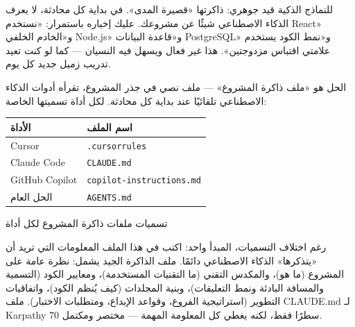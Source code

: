 


للنماذج الذكية قيد جوهري: ذاكرتها «قصيرة المدى». في بداية كل محادثة، لا يعرف الذكاء الاصطناعي شيئًا عن مشروعك. عليك إخباره باستمرار: «نستخدم React» و«الخادم الخلفي Node.js» و«قاعدة البيانات PostgreSQL» و«نمط الكود يستخدم علامتي اقتباس مزدوجتين». هذا غير فعال ويسهل فيه النسيان — كما لو كنت تعيد تدريب زميل جديد كل يوم.

الحل هو «ملف ذاكرة المشروع» — ملف نصي في جذر المشروع، تقرأه أدوات الذكاء الاصطناعي تلقائيًا عند بداية كل محادثة. لكل أداة تسميتها الخاصة:

\begin{center}
\begin{tabularx}{\linewidth}{|X|X|}
\hline
\textbf{الأداة} & \textbf{اسم الملف} \tabularnewline
\hline
Cursor & \texttt{.\allowbreak cursorrules} \tabularnewline
Claude Code & \texttt{CLAUDE.\allowbreak md} \tabularnewline
GitHub Copilot & \texttt{copilot-\allowbreak instructions.\allowbreak md} \tabularnewline
الحل العام & \texttt{AGENTS.\allowbreak md} \tabularnewline
\hline
\end{tabularx}
\end{center}

\begin{center}\small\color{gray}تسميات ملفات ذاكرة المشروع لكل أداة\end{center}

رغم اختلاف التسميات، المبدأ واحد: اكتب في هذا الملف المعلومات التي تريد أن «يتذكرها» الذكاء الاصطناعي دائمًا. ملف الذاكرة الجيد يشمل: نظرة عامة على المشروع (ما هو)، والمكدس التقني (ما التقنيات المستخدمة)، ومعايير الكود (التسمية والمسافة البادئة ونمط التعليقات)، وبنية المجلدات (كيف يُنظم الكود)، واتفاقيات التطوير (استراتيجية الفروع، وقواعد الإيداع، ومتطلبات الاختبار). ملف CLAUDE.md لـ Karpathy 70 سطرًا فقط، لكنه يغطي كل المعلومة المهمة — مختصر ومكتمل.

